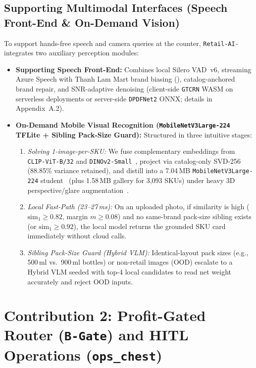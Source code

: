 \subsection*{Supporting Multimodal Interfaces (Speech Front-End \& On-Demand Vision)}
To support hands-free speech and camera queries at the counter, \texttt{Retail-AI-} integrates two auxiliary perception modules:
\begin{itemize}
    \item \textbf{Supporting Speech Front-End:} Combines local Silero VAD~v6, streaming Azure Speech with Thanh Lam Mart brand biasing (), catalog-anchored brand repair, and SNR-adaptive denoising (client-side \texttt{GTCRN} WASM on serverless deployments or server-side \texttt{DPDFNet2} ONNX; details in Appendix~A.2).
    \item \textbf{On-Demand Mobile Visual Recognition (\texttt{MobileNetV3Large-224} TFLite + Sibling Pack-Size Guard):} Structured in three intuitive stages:
    \begin{enumerate}[leftmargin=1.5em, itemsep=1pt]
        \item \emph{Solving 1-image-per-SKU:} We fuse complementary embeddings from \texttt{CLIP-ViT-B/32} and \texttt{DINOv2-Small}~\cite{radford2021clip,oquab2024dinov2}, project via catalog-only SVD-256 (88.85\% variance retained), and distill into a 7.04\,MB \texttt{MobileNetV3Large-224} student~\cite{howard2019mobilenetv3,retail_tflite_kaggle} (plus 1.58\,MB gallery for 3,093 SKUs) under heavy 3D perspective/glare augmentation~\cite{deng2020subcenter,khosla2020supcon}.
        \item \emph{Local Fast-Path (23--27\,ms):} On an uploaded photo, if similarity is high ($\text{sim}_1 \ge 0.82$, margin $m \ge 0.08$) and no same-brand pack-size sibling exists (or $\text{sim}_1 \ge 0.92$), the local model returns the grounded SKU card immediately without cloud calls.
        \item \emph{Sibling Pack-Size Guard (Hybrid VLM):} Identical-layout pack sizes (e.g., 500\,ml vs.\ 900\,ml bottles) or non-retail images (OOD) escalate to a Hybrid VLM seeded with top-4 local candidates to read net weight accurately and reject OOD inputs.
    \end{enumerate}
\end{itemize}

\section{Contribution 2: Profit-Gated Router (\texttt{B-Gate}) and HITL Operations (\texttt{ops\_chest})}

